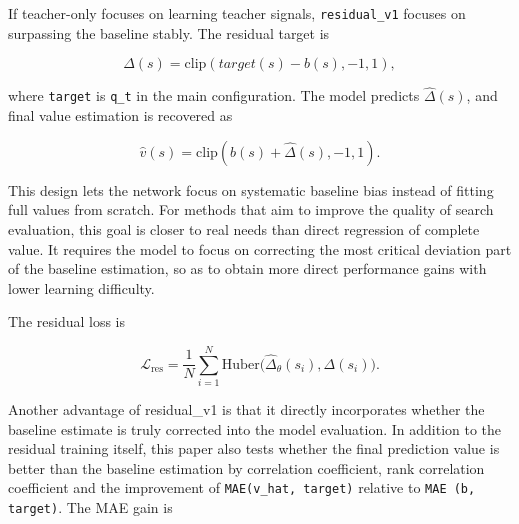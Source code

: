 If teacher-only focuses on learning teacher signals, \texttt{residual_v1} focuses on surpassing the baseline stably. The residual target is


\begin{equation}
\Delta(s)=\mathrm{clip}(target(s)-b(s),-1,1),
\end{equation}


where \texttt{target} is \texttt{q_t} in the main configuration. The model predicts $\hat{\Delta}(s)$, and final value estimation is recovered as

\begin{equation}
\hat{v}(s)=\mathrm{clip}(b(s)+\hat{\Delta}(s),-1,1).
\end{equation}


This design lets the network focus on systematic baseline bias instead of fitting full values from scratch. For methods that aim to improve the quality of search evaluation, this goal is closer to real needs than direct regression of complete value. It requires the model to focus on correcting the most critical deviation part of the baseline estimation, so as to obtain more direct performance gains with lower learning difficulty.

 The residual loss is

\begin{equation}
\mathcal{L}_{\mathrm{res}}
=
\frac{1}{N}\sum_{i=1}^{N}
\mathrm{Huber}\bigl(\hat{\Delta}_{\theta}(s_i),\Delta(s_i)\bigr).
\end{equation}

Another advantage of residual_v1 is that it directly incorporates whether the baseline estimate is truly corrected into the model evaluation. In addition to the residual training itself, this paper also tests whether the final prediction value is better than the baseline estimation by correlation coefficient, rank correlation coefficient and the improvement of \texttt{MAE(v_hat, target)} relative to \texttt{MAE (b, target)}. The MAE gain is



